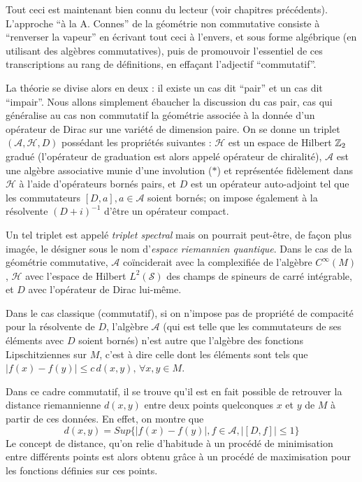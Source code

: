 Tout ceci est maintenant bien connu du lecteur (voir chapitres 
pr\'ec\'edents). L'approche ``\`a la A. Connes'' \cite{ACbook} de la g\'eom\'etrie non commutative consiste \`a 
``renverser la vapeur'' en \'ecrivant tout ceci \`a l'envers, et sous forme alg\'ebrique 
(en utilisant des alg\`ebres commutatives), 
puis de promouvoir l'essentiel de ces transcriptions au rang de 
d\'efinitions, en effa\c cant l'adjectif ``commutatif''. 

La th\'eorie se 
divise alors en deux : il existe un cas dit ``pair''  et un cas dit 
``impair''. Nous allons simplement \'ebaucher la discussion du cas 
pair, cas qui g\'en\'eralise au cas non commutatif la g\'eom\'etrie associ\'ee \`a 
la donn\'ee d'un op\'erateur de Dirac sur une vari\'et\'e de dimension paire.
On se donne un triplet $({\mathcal A}, {\mathcal H}, D)$ 
poss\'edant les propri\'et\'es suivantes : ${\mathcal H}$ est un espace de 
Hilbert $\mathbb{Z}_{2}$ gradu\'e (l'op\'erateur de graduation est alors appel\'e 
op\'erateur de chiralit\'e),  ${\mathcal A}$ est une alg\`ebre associative munie d'une involution ($*$) et 
repr\'esent\'ee fid\`element dans ${\mathcal H}$ \`a l'aide d'op\'erateurs born\'es 
pairs, et $D$ est un op\'erateur auto-adjoint tel que les commutateurs 
$[D,a], a \in {\mathcal A}$ soient born\'es; on impose \'egalement \`a la r\'esolvente  $(D+i)^{-1}$  d'\^etre un 
op\'erateur compact. 


Un tel triplet est appel\'e {\sl triplet spectral} 
mais on pourrait peut-\^etre, de fa\c con plus imag\'ee, le d\'esigner sous le 
nom d'{\sl espace riemannien quantique\/}. Dans le cas de la g\'eom\'etrie 
commutative, ${\mathcal A}$ co\"inciderait avec la
complexifi\'ee de l'alg\`ebre 
$C^\infty(M)$, ${\mathcal H}$ avec l'espace de Hilbert $L^{2}(\mathcal 
S)$ des champs de spineurs de carr\'e int\'egrable, et $D$ avec 
l'op\'erateur de Dirac lui-m\^eme.

Dans le cas classique (commutatif), si on n'impose pas de propri\'et\'e 
de compacit\'e pour la r\'esolvente de $D$, l'alg\`ebre ${\mathcal A}$ (qui est telle que les commutateurs de ses \'el\'ements avec $D$ 
soient born\'es) n'est autre que l'alg\`ebre des fonctions  
Lipschitziennes sur $M$, c'est \`a dire celle dont les \'el\'ements sont 
tels que  $\vert f(x) - f(y) \vert 
\leq c \, d(x,y), \, \forall x,y \in M$.

Dans ce cadre commutatif, il se trouve 
qu'il est en fait possible de retrouver la distance riemannienne 
$d(x,y)$ entre deux points quelconques $x$ et $y$ de $M$ \`a partir de ces 
donn\'ees. En effet, on montre que
$$
d(x,y) = Sup\{\vert f(x) - f(y) \vert, f\in {\mathcal A}, 
\vert[D,f]\vert \leq 1 \}
$$
Le concept de distance, qu'on relie d'habitude \`a un proc\'ed\'e de 
minimisation entre diff\'erents points est alors obtenu gr\^ace \`a un 
proc\'ed\'e de maximisation pour les fonctions d\'efinies sur ces points.

